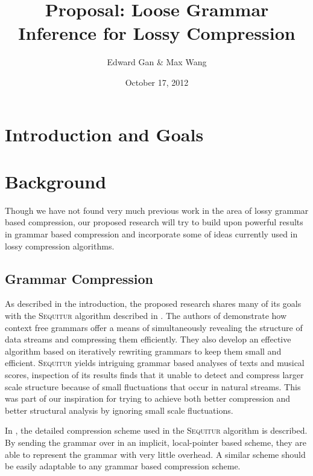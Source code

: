 \documentclass[11pt]{article}
\newcommand{\Sequitur}{\textsc{Sequitur}\xspace}
\begin{document}


\title{Proposal: Loose Grammar Inference for Lossy Compression}
\author{Edward Gan \& Max Wang}
\date{October 17, 2012}
\maketitle

\section{Introduction and Goals}

\section{Background}

Though we have not found very much previous work in the area of lossy grammar
based compression, our proposed research will try to build upon powerful
results in grammar based compression and incorporate some of ideas currently
used in lossy compression algorithms.

\subsection{Grammar Compression}

As described in the introduction, the proposed research shares many of its
goals with the \Sequitur algorithm described in \cite{sequitur}.  The authors
of \cite{sequitur} demonstrate how context free grammars offer a means of
simultaneously revealing the structure of data streams and compressing them
efficiently.  They also develop an effective algorithm based on iteratively
rewriting grammars to keep them small and efficient. \Sequitur yields
intriguing grammar based analyses of texts and musical scores, inspection of
its results finds that it unable to detect and compress larger scale structure
because of small fluctuations that occur in natural streams.  This was part of
our inspiration for trying to achieve both better compression and better
structural analysis by ignoring small scale fluctuations.

In \cite{sequitur2}, the detailed compression scheme used in the \Sequitur
algorithm is described.  By sending the grammar over in an implicit,
local-pointer based scheme, they are able to represent the grammar with very
little overhead.  A similar scheme should be easily adaptable to any grammar
based compression scheme.
\end{document}
